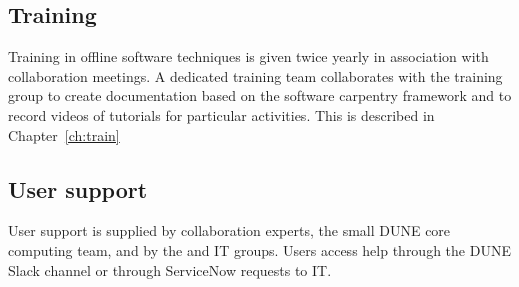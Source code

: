 \documentclass[../main-v1.tex]{subfiles}
\begin{document}




\subsection{Training}
Training in offline software techniques is given twice yearly in association with  collaboration meetings.  A dedicated training team collaborates with the  training group to create documentation based on the software carpentry framework and to record videos of tutorials for particular activities. This is described in Chapter~\ref{ch:train}

\subsection{User support}
User support is supplied by collaboration experts, the small DUNE core computing team, and by the  and  IT groups. 
Users access help through the DUNE Slack channel or through ServiceNow requests to  IT. 





\pagebreak




\end{document}
